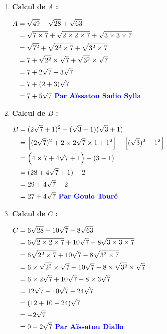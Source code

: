 \documentclass[12pt,a4paper]{article}
\begin{document}
\begin{enumerate}
    \item \textbf{Calcul de $A$ :}
    
    $
    \begin{aligned}
    A &= \sqrt{49} + \sqrt{28} + \sqrt{63} \\
    &= \sqrt{7 \times 7} + \sqrt{2 \times 2 \times 7} + \sqrt{3 \times 3 \times 7} \\
    &= \sqrt{7^2} + \sqrt{2^2 \times 7} + \sqrt{3^2 \times 7} \\
    &= 7 + \sqrt{2^2} \times \sqrt{7} + \sqrt{3^2} \times \sqrt{7} \\
    &= 7 + 2\sqrt{7} + 3\sqrt{7} \\
    &= 7 + (2 + 3)\sqrt{7} \\
    &= 7 + 5\sqrt{7} \textbf{ \textcolor{blue}{ Par Aïssatou Sadio Sylla}}
    \end{aligned}
    $

    \item \textbf{Calcul de $B$ :}
    
    $
    \begin{aligned}
    B &= (2\sqrt{7} + 1)^2 - (\sqrt{3} - 1)(\sqrt{3} + 1) \\
    &= \left[(2\sqrt{7})^2 + 2 \times 2\sqrt{7} \times 1 + 1^2\right] - \left[(\sqrt{3})^2 - 1^2\right] \\
    &= \left(4 \times 7 + 4\sqrt{7} + 1\right) - (3 - 1) \\
    &= (28 + 4\sqrt{7} + 1) - 2 \\
    &= 29 + 4\sqrt{7} - 2 \\
    &= 27 + 4\sqrt{7} \textbf{ \textcolor{blue}{ Par Goulo Touré}}
    \end{aligned}
    $

    \item \textbf{Calcul de $C$ :}
    
    $
    \begin{aligned}
    C &= 6\sqrt{28} + 10\sqrt{7} - 8\sqrt{63} \\
    &= 6\sqrt{2 \times 2 \times 7} + 10\sqrt{7} - 8\sqrt{3 \times 3 \times 7} \\
    &= 6\sqrt{2^2 \times 7} + 10\sqrt{7} - 8\sqrt{3^2 \times 7} \\
    &= 6 \times \sqrt{2^2} \times \sqrt{7} + 10\sqrt{7} - 8 \times \sqrt{3^2} \times \sqrt{7} \\
    &= 6 \times 2\sqrt{7} + 10\sqrt{7} - 8 \times 3\sqrt{7} \\
    &= 12\sqrt{7} + 10\sqrt{7} - 24\sqrt{7} \\
    &= (12 + 10 - 24)\sqrt{7} \\
    &= -2\sqrt{7} \\
    &= 0 - 2\sqrt{7} \textbf{ \textcolor{blue}{ Par Aïssatou Diallo }}
    \end{aligned}
    $
\end{enumerate}
\end{document}
